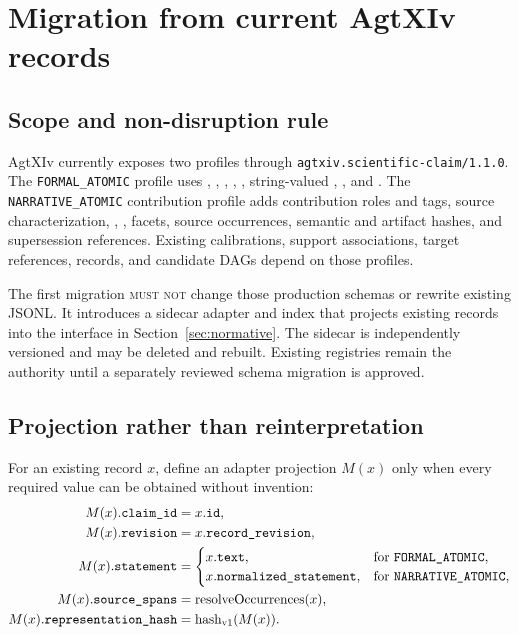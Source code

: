 \section{Migration from current AgtXIv records}\label{sec:migration}

\subsection{Scope and non-disruption rule}

AgtXIv currently exposes two profiles through \texttt{agtxiv.scientific-claim/1.1.0}. The \texttt{FORMAL\_ATOMIC} profile uses , , , , , string-valued , , and . The \texttt{NARRATIVE\_ATOMIC} contribution profile adds contribution roles and tags, source characterization, , , facets, source occurrences, semantic and artifact hashes, and supersession references. Existing calibrations, support associations, target references, \MathClaimIR{} records, and candidate DAGs depend on those profiles.

The first migration \textsc{must not} change those production schemas or rewrite existing JSONL. It introduces a sidecar adapter and index that projects existing records into the interface in Section~\ref{sec:normative}. The sidecar is independently versioned and may be deleted and rebuilt. Existing registries remain the authority until a separately reviewed schema migration is approved.

\subsection{Projection rather than reinterpretation}

For an existing record $x$, define an adapter projection $M(x)$ only when every required value can be obtained without invention:
\begin{align*}
M(x).\texttt{claim\_id}
  &= x.\texttt{id},\\
M(x).\texttt{revision}
  &= x.\texttt{record\_revision},\\
M(x).\texttt{statement}
  &=
  \begin{cases}
  x.\texttt{text}, & \text{for \texttt{FORMAL\_ATOMIC}},\\
  x.\texttt{normalized\_statement}, & \text{for \texttt{NARRATIVE\_ATOMIC}},
  \end{cases}\\
M(x).\texttt{source\_spans}
  &= \operatorname{resolveOccurrences}(x),\\
M(x).\texttt{representation\_hash}
  &= \operatorname{hash}_{\mathrm{v1}}(M(x)).
\end{align*}

